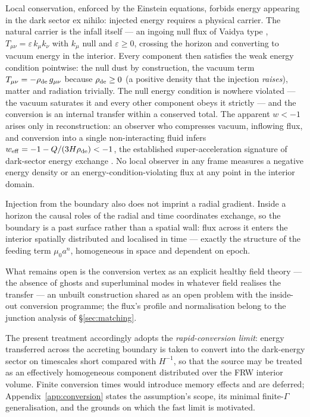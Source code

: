 \documentclass[11pt,a4paper]{article}
\newcommand{\weff}{w_{\rm eff}}
\begin{document}
Local conservation, enforced by the Einstein equations, forbids energy appearing in the dark sector ex nihilo: injected energy requires a physical carrier. The natural carrier is the infall itself --- an ingoing null flux of Vaidya type \citep{Vaidya1951}, $T_{\mu\nu}=\varepsilon\,k_\mu k_\nu$ with $k_\mu$ null and $\varepsilon\ge0$, crossing the horizon and converting to vacuum energy in the interior. Every component then satisfies the weak energy condition pointwise: the null dust by construction, the vacuum term $T_{\mu\nu}=-\rho_{\rm de}\,g_{\mu\nu}$ because $\rho_{\rm de}\ge0$ (a positive density that the injection \emph{raises}), matter and radiation trivially. The null energy condition is nowhere violated --- the vacuum saturates it and every other component obeys it strictly --- and the conversion is an internal transfer within a conserved total. The apparent $w<-1$ arises only in reconstruction: an observer who compresses vacuum, inflowing flux, and conversion into a single non-interacting fluid infers $\weff=-1-Q/(3H\rho_{\rm de})<-1$, the established super-acceleration signature of dark-sector energy exchange \citep{DasCorasanitiKhoury2006}. No local observer in any frame measures a negative energy density or an energy-condition-violating flux at any point in the interior domain.

Injection from the boundary also does not imprint a radial gradient. Inside a horizon the causal roles of the radial and time coordinates exchange, so the boundary is a past surface rather than a spatial wall: flux across it enters the interior spatially distributed and localised in time --- exactly the structure of the feeding term $\mu_0 a^n$, homogeneous in space and dependent on epoch.

What remains open is the conversion vertex as an explicit healthy field theory --- the absence of ghosts and superluminal modes in whatever field realises the transfer --- an unbuilt construction shared as an open problem with the inside-out conversion programme; the flux's profile and normalisation belong to the junction analysis of \S\ref{sec:matching}.

The present treatment accordingly adopts the \emph{rapid-conversion limit}: energy transferred across the accreting boundary is taken to convert into the dark-energy sector on timescales short compared with $H^{-1}$, so that the source may be treated as an effectively homogeneous component distributed over the FRW interior volume. Finite conversion times would introduce memory effects and are deferred; Appendix~\ref{app:conversion} states the assumption's scope, its minimal finite-$\Gamma$ generalisation, and the grounds on which the fast limit is motivated.
\end{document}
